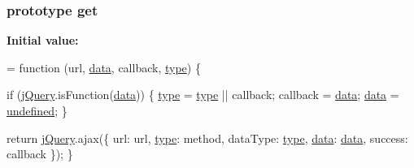 \subsubsection[{\texorpdfstring{get}{get}}]{ {\bf prototype} get}\hypertarget{jquery-2_82_81-vsdoc_8js_a904e08d31e9d836b29247ea5e274ae83}{}\label{jquery-2_82_81-vsdoc_8js_a904e08d31e9d836b29247ea5e274ae83}
{\bfseries Initial value\+:}
\begin{DoxyCode}
= \textcolor{keyword}{function} (url, \hyperlink{jquery-2_82_81-vsdoc_8js_a609407b3456fdc3c5671a9fc4a226ff7}{data}, callback, \hyperlink{jquery-2_82_81-vsdoc_8js_a3940565e83a9bfd10d95ffd27536da91}{type}) \{
        

        
        \textcolor{keywordflow}{if} (\hyperlink{jquery-2_82_81-vsdoc_8js_add5237586d970a38a81f990e8eb28c6c}{jQuery}.isFunction(\hyperlink{jquery-2_82_81-vsdoc_8js_a609407b3456fdc3c5671a9fc4a226ff7}{data})) \{
            \hyperlink{jquery-2_82_81-vsdoc_8js_a3940565e83a9bfd10d95ffd27536da91}{type} = \hyperlink{jquery-2_82_81-vsdoc_8js_a3940565e83a9bfd10d95ffd27536da91}{type} || callback;
            callback = \hyperlink{jquery-2_82_81-vsdoc_8js_a609407b3456fdc3c5671a9fc4a226ff7}{data};
            \hyperlink{jquery-2_82_81-vsdoc_8js_a609407b3456fdc3c5671a9fc4a226ff7}{data} = \hyperlink{jquery-2_82_81-vsdoc_8js_a08113a236cc18d2a9d5ce27e638012be}{undefined};
        \}

        \textcolor{keywordflow}{return} \hyperlink{jquery-2_82_81-vsdoc_8js_add5237586d970a38a81f990e8eb28c6c}{jQuery}.ajax(\{
            url: url,
            \hyperlink{jquery-2_82_81-vsdoc_8js_a3940565e83a9bfd10d95ffd27536da91}{type}: method,
            dataType: \hyperlink{jquery-2_82_81-vsdoc_8js_a3940565e83a9bfd10d95ffd27536da91}{type},
            \hyperlink{jquery-2_82_81-vsdoc_8js_a609407b3456fdc3c5671a9fc4a226ff7}{data}: \hyperlink{jquery-2_82_81-vsdoc_8js_a609407b3456fdc3c5671a9fc4a226ff7}{data},
            success: callback
        \});
    \}
\end{DoxyCode}
